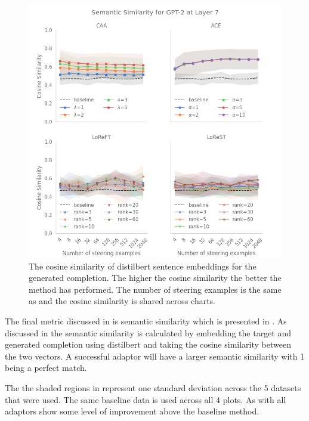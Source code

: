 \begin{figure}
    \centering
    \captionsetup{width=.9\textwidth}
    \includegraphics[width=\textwidth]{figures/gpt2_7_similarity.png}
    \caption{
        The cosine similarity of distilbert \citep{distilbert} sentence embeddings for the generated completion.
        The higher the cosine similarity the better the method has performed.
        The number of steering examples is the same as  and the cosine similarity is shared across charts.
    }
    \label{fig:gpt-pp-sim} \end{figure}

The final metric discussed in  is semantic similarity which is presented in .
As discussed in  the semantic similarity is calculated by embedding the target and generated completion using distilbert \citep{distilbert} and taking the cosine similarity between the two vectors.
A successful adaptor will have a larger semantic similarity with 1 being a perfect match.

The the shaded regions in  represent one standard deviation across the 5 datasets that were used.
The same baseline data is used across all 4 plots.
As with  all adaptors show some level of improvement above the baseline method.

